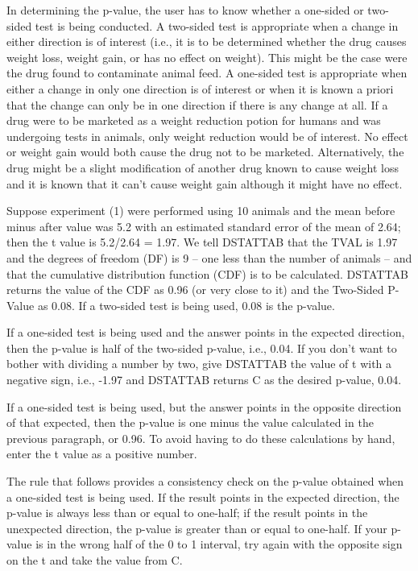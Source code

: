 \documentclass[12pt,dvips]{article}
\begin{document}
     In determining the p-value, the user has to  know whether  a one-sided
     or two-sided test is being conducted.  A two-sided test is appropriate
     when a change in either direction is  of interest  (i.e., it is  to be
     determined whether the drug causes weight loss, weight gain, or has no
     effect  on weight).  This  might be the case  were the drug  found  to
     contaminate animal feed.  A  one-sided test is appropriate when either
     a change in only one  direction is of interest or  when it  is known a
     priori that the  change can only be  in one  direction if there is any
     change  at all.  If a drug  were to  be marketed as a weight reduction
     potion for  humans and was undergoing tests   in animals, only  weight
     reduction would be  of interest.  No effect  or weight gain would both
     cause the drug not to be marketed.  Alternatively, the drug might be a
     slight modification of another drug known to  cause weight loss and it
     is known that it  can't cause weight  gain although it might   have no
     effect.
     
     Suppose experiment  (1) were performed  using 10 animals  and the mean
     before minus after value was 5.2  with an estimated  standard error of
     the  mean of 2.64; then  the  t value  is  5.2/2.64 = 1.97.   We  tell
     DSTATTAB that the TVAL is 1.97 and the degrees of freedom (DF) is 9 --
     one  less than  the  number  of  animals --  and  that  the cumulative
     distribution function (CDF) is  to be calculated. DSTATTAB returns the
     value  of the CDF   as 0.96  (or very  close to it)  and the Two-Sided
     P-Value as 0.08.  If  a  two-sided test is  being  used, 0.08  is  the
     p-value.
     
     If  a  one-sided test  is   being used and   the answer points  in the
     expected direction, then the p-value is half of the two-sided p-value,
     i.e., 0.04. If you don't want to bother with dividing a number by two,
     give DSTATTAB the value  of t  with a negative  sign, i.e.,  -1.97 and
     DSTATTAB returns C as the desired p-value, 0.04.
     
     If a one-sided  test  is being  used,  but the answer   points in  the
     opposite direction of that expected, then the p-value is one minus the
     value calculated in the previous paragraph,  or 0.96.  To avoid having
     to do these  calculations by hand,  enter  the  t value as a  positive
     number.
     
     The rule that  follows provides a  consistency   check on the  p-value
     obtained when a one-sided test is being used.  If the result points in
     the  expected direction, the  p-value is always  less than or equal to
     one-half; if the   result   points in the   unexpected direction,  the
     p-value is greater than or equal  to one-half.  If  your p-value is in
     the wrong half of the  0 to 1 interval,   try again with the  opposite
     sign on the t and take the value from C.
\end{document}
